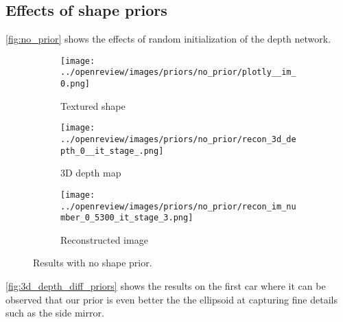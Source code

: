 \subsection{Effects of shape priors}
\autoref{fig:no_prior} shows the effects of random initialization of the depth network.
\begin{figure}[!htb]
\centering
\begin{subfigure}{0.30\textwidth}
    \centering
    \texttt{[image: ../openreview/images/priors/no\_prior/plotly\_\_im\_0.png]}
    \caption{Textured shape}
    
\end{subfigure}
\begin{subfigure}{0.30\textwidth}
    \centering
    \texttt{[image: ../openreview/images/priors/no\_prior/recon\_3d\_depth\_0\_\_it\_stage\_.png]}
    \caption{3D depth map}
    
\end{subfigure}
\begin{subfigure}{0.30\textwidth}
    \centering
    \texttt{[image: ../openreview/images/priors/no\_prior/recon\_im\_number\_0\_5300\_it\_stage\_3.png]}
    \caption{Reconstructed image}
    
\end{subfigure}
    \caption{Results with no shape prior.}
    \label{fig:no_prior}
\end{figure}
\autoref{fig:3d_depth_diff_priors} shows the results on the first car where it can be observed that our prior is even better the the ellipsoid at capturing fine details such as the side mirror.
